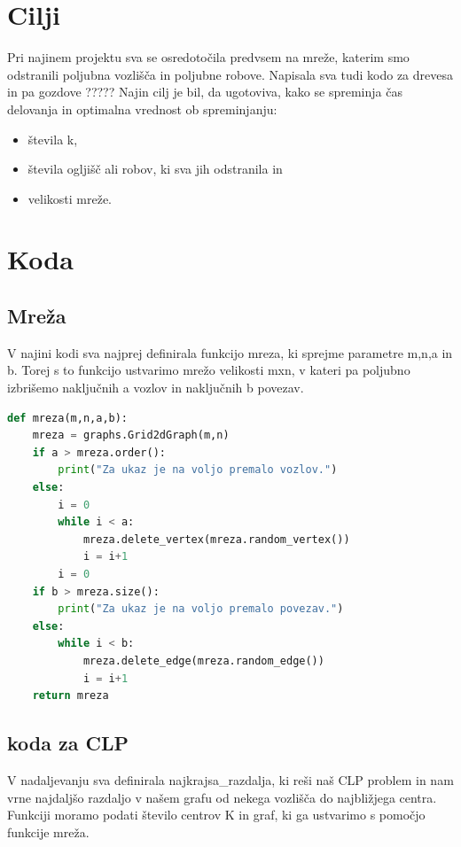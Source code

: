 \documentclass[a4paper]{article}
\begin{document}
\section{Cilji}
Pri najinem projektu sva se osredotočila predvsem na mreže, katerim smo odstranili poljubna vozlišča in poljubne robove. Napisala sva tudi kodo za drevesa in pa gozdove ?????
Najin cilj je bil, da ugotoviva, kako se spreminja čas delovanja in optimalna vrednost ob spreminjanju:
\begin{itemize}
\item{števila k,}
\item{števila ogljišč ali robov, ki sva jih odstranila in}
\item{velikosti mreže.}
\end{itemize}

\section{Koda}

\subsection{Mreža}
V najini kodi sva najprej definirala funkcijo mreza, ki sprejme parametre m,n,a in b. Torej s to funkcijo ustvarimo mrežo velikosti mxn, v kateri pa poljubno izbrišemo naključnih a vozlov in naključnih b povezav.

\begin{lstlisting}[language=Python]
def mreza(m,n,a,b):
    mreza = graphs.Grid2dGraph(m,n)
    if a > mreza.order():
        print("Za ukaz je na voljo premalo vozlov.")
    else:
        i = 0
        while i < a:
            mreza.delete_vertex(mreza.random_vertex())
            i = i+1
        i = 0
    if b > mreza.size():
        print("Za ukaz je na voljo premalo povezav.")
    else:
        while i < b:
            mreza.delete_edge(mreza.random_edge())
            i = i+1
    return mreza
\end{lstlisting}

\subsection{koda za CLP}
V nadaljevanju sva definirala najkrajsa\_razdalja, ki reši naš CLP problem in nam vrne najdaljšo razdaljo v našem grafu od nekega vozlišča do najbližjega centra. Funkciji moramo podati število centrov K in graf, ki ga ustvarimo s pomočjo funkcije mreža.
\end{document}

